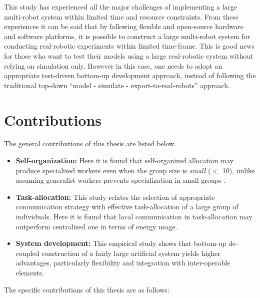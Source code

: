 This study has experienced all the major challenges of implementing a large multi-robot system within limited time and resource constraints. From these experiences it can be said that by following flexible and open-source hardware and software platforms, it is possible to construct a large multi-robot system for conducting real-robotic experiments within limited time-frame. This is good news for those who want to test their models using a large real-robotic system without relying on simulation only. However in this case, one needs to adopt an appropriate test-driven bottom-up development approach, instead of following the traditional top-down ``model - simulate -  export-to-real-robots'' approach. 
\section{Contributions}
The general contributions of this thesis are listed below.
\begin{itemize}
    \item \textbf{Self-organization: } 
Here it is found that self-organized allocation may produce specialized workers even when the group size is \textit{small} ($<$ 10), unlike assuming generalist workers prevents specialization in small groups \cite{Garnier+2007}.
    \item \textbf{Task-allocation: }
This study relates the selection of appropriate communication strategy with effective task-allocation of a large group of individuals. Here it is found that local communication in task-allocation may outperform centralized one in terms of energy usage.
\item \textbf{System development: }
This empirical study shows that bottom-up de-coupled construction of a fairly large artificial system yields higher advantages, particularly flexibility and integration with inter-operable elements.%
\end{itemize}
The specific contributions of this thesis are as follows:
